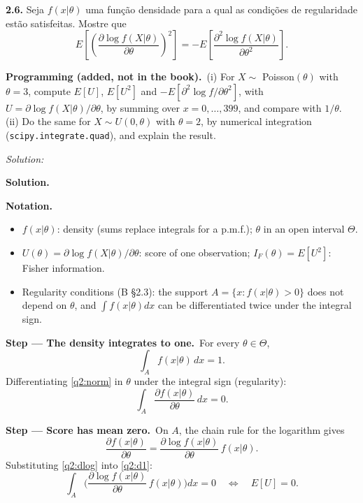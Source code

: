 \documentclass[11pt,a4paper]{article}
\newif\ifsolucoes
\newcommand{\espacoresol}{4.5cm}   %
\numberwithin{equation}{questao}   %
\newcommand{\programacao}{\par\smallskip\noindent\textbf{Programming (added, not in the book).}~}
\newenvironment{notacao}{\par\smallskip\noindent\textbf{Notation.}\begin{itemize}[leftmargin=1.4em,topsep=1pt,itemsep=0pt]\small}{\end{itemize}}
\newcommand{\resolespaco}{\ifsolucoes\else\par\textit{Solution:}\vspace{\espacoresol}\par\fi}
\newcommand{\passo}[2]{\par\smallskip\noindent\textbf{Step --- #1.}~#2}
\newcommand{\solhead}{\par\medskip\noindent{\color{blue!55!black}\rule{\linewidth}{0.3pt}}\par\noindent\textbf{Solution.}}
\newcommand{\1}{\mathbf{1}}
\begin{document}
\begin{otherlanguage}{brazil}
\textbf{2.6.} Seja $f(x|\theta)$ uma função densidade para a qual as condições de regularidade
estão satisfeitas. Mostre que
\[
E\left[\left(\frac{\partial\log f(X|\theta)}{\partial\theta}\right)^2\right]
=-E\left[\frac{\partial^2\log f(X|\theta)}{\partial\theta^2}\right].
\]
\end{otherlanguage}
\programacao (i) For $X\sim$ Poisson$(\theta)$ with $\theta=3$, compute $E[U]$, $E[U^2]$ and
$-E[\partial^2\log f/\partial\theta^2]$, with $U=\partial\log f(X|\theta)/\partial\theta$, by summing over
$x=0,\dots,399$, and compare with $1/\theta$. (ii) Do the same for $X\sim U(0,\theta)$ with
$\theta=2$, by numerical integration (\texttt{scipy.integrate.quad}), and explain the result.
\resolespaco
\begin{sol}
\solhead
\begin{notacao}
\item $f(x|\theta)$: density (sums replace integrals for a p.m.f.); $\theta$ in an open interval $\Theta$.
\item $U(\theta)=\partial\log f(X|\theta)/\partial\theta$: score of one observation;
  $I_F(\theta)=E[U^2]$: Fisher information.
\item Regularity conditions (B §2.3): the support $A=\{x:f(x|\theta)>0\}$ does not depend on
  $\theta$, and $\int f(x|\theta)dx$ can be differentiated twice under the integral sign.
\end{notacao}

\passo{The density integrates to one}{For every $\theta\in\Theta$,}
\begin{equation}\label{q2:norm}
\int_A f(x|\theta)\,dx=1 .
\end{equation}
Differentiating \eqref{q2:norm} in $\theta$ under the integral sign (regularity):
\begin{equation}\label{q2:d1}
\int_A\frac{\partial f(x|\theta)}{\partial\theta}\,dx=0 .
\end{equation}

\passo{Score has mean zero}{On $A$, the chain rule for the logarithm gives}
\begin{equation}\label{q2:dlog}
\frac{\partial f(x|\theta)}{\partial\theta}=\frac{\partial\log f(x|\theta)}{\partial\theta}\,f(x|\theta).
\end{equation}
Substituting \eqref{q2:dlog} into \eqref{q2:d1}:
\begin{equation}\label{q2:EU}
\int_A\Big(\frac{\partial\log f(x|\theta)}{\partial\theta}\,f(x|\theta)\Big)dx=0
\quad\Longleftrightarrow\quad E[U]=0 .
\end{equation}


\end{sol}
\end{document}
